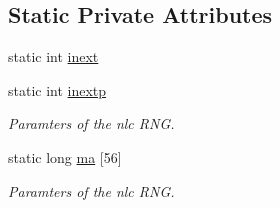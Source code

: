 \subsection*{Static Private Attributes}
\begin{DoxyCompactItemize}
\item 
static int \hyperlink{class_c_n_l_c_r_n_g_a47b1286233faf1258a8f80efceb9755f}{inext}
\item 
static int \hyperlink{class_c_n_l_c_r_n_g_a1494412ce498bba1816cded65eb5c7a8}{inextp}
\begin{DoxyCompactList}\small\item\em Paramters of the nlc R\-N\-G. \end{DoxyCompactList}\item 
static long \hyperlink{class_c_n_l_c_r_n_g_a8914193c82393d27b6343f47dd750267}{ma} \mbox{[}56\mbox{]}
\begin{DoxyCompactList}\small\item\em Paramters of the nlc R\-N\-G. \end{DoxyCompactList}\end{DoxyCompactItemize}


